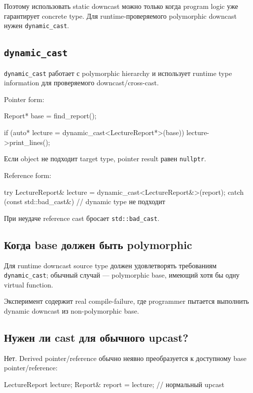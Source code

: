 Поэтому использовать static downcast можно только когда program logic уже
гарантирует concrete type. Для runtime-проверяемого polymorphic downcast нужен
\texttt{dynamic\_cast}.

\subsection{\texttt{dynamic\_cast}}

\texttt{dynamic\_cast} работает с polymorphic hierarchy и использует runtime
type information для проверяемого downcast/cross-cast.

Pointer form:

\begin{cppcode}
Report* base = find_report();

if (auto* lecture = dynamic_cast<LectureReport*>(base)) {
    lecture->print_lines();
}
\end{cppcode}

Если object не подходит target type, pointer result равен
\texttt{nullptr}.

Reference form:

\begin{cppcode}
try {
    LectureReport& lecture = dynamic_cast<LectureReport&>(report);
} catch (const std::bad_cast&) {
    // dynamic type не подходит
}
\end{cppcode}

При неудаче reference cast бросает \texttt{std::bad\_cast}.

\subsection{Когда base должен быть polymorphic}

Для runtime downcast source type должен удовлетворять требованиям
\texttt{dynamic\_cast}; обычный случай --- polymorphic base, имеющий хотя бы
одну virtual function.

Эксперимент содержит real compile-failure, где programmer пытается выполнить
dynamic downcast из non-polymorphic base.

\subsection{Нужен ли cast для обычного upcast?}

Нет. Derived pointer/reference обычно неявно преобразуется к доступному base
pointer/reference:

\begin{cppcode}
LectureReport lecture;
Report& report = lecture; // нормальный upcast
\end{cppcode}

